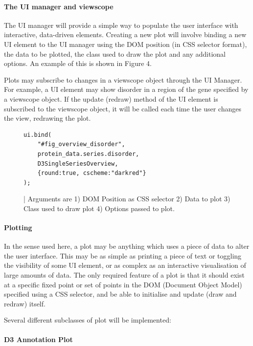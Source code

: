 \documentclass[fleqn,10pt]{article} %
\begin{document}
\paragraph{The UI manager and viewscope}

The UI manager will provide a simple way to populate the user interface with interactive, data-driven elements. Creating a new plot will involve binding a new UI element to the UI manager using the DOM position (in CSS selector format), the data to be plotted, the class used to draw the plot and any additional options. An example of this is shown in Figure 4.

Plots may subscribe to changes in a viewscope object through the UI Manager. For example, a UI element may show disorder in a region of the gene specified by a viewscope object. If the update (redraw) method of the UI element is subscribed to the viewscope object, it will be called each time the user changes the view, redrawing the plot.

\begin{figure}
\begin{lstlisting}
ui.bind(
	"#fig_overview_disorder", 
	protein_data.series.disorder,
	D3SingleSeriesOverview, 
	{round:true, cscheme:"darkred"} 
);
\end{lstlisting}
\caption{ | Arguments are 1) DOM Position as CSS selector 2) Data to plot 3) Class used to draw plot 4) Options passed to plot.}
\end{figure}

\paragraph{Plotting}

In the sense used here, a plot may be anything which uses a piece of data to alter the user interface. This may be as simple as printing a piece of text or toggling the visibility of some UI element, or as complex as an interactive visualisation of large amounts of data. The only required feature of a plot is that it should exist at a specific fixed point or set of points in the DOM (Document Object Model) specified using a CSS selector, and be able to initialise and update (draw and redraw) itself.

Several different subclasses of plot will be implemented:

\paragraph{D3 Annotation Plot}
\end{document}
